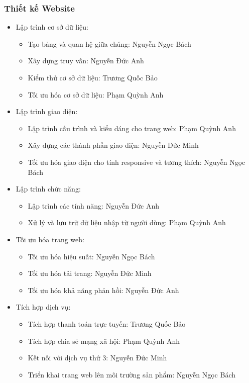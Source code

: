 \documentclass[12pt]{article}
\begin{document}
\subsubsection{Thiết kế Website}
\begin{itemize}[label=-, leftmargin=1cm]
    \item Lập trình cơ sở dữ liệu:
    \begin{itemize}[label=+, leftmargin=1cm]
        \item Tạo bảng và quan hệ giữa chúng: Nguyễn Ngọc Bách
        \item Xây dựng truy vấn: Nguyễn Đức Anh
        \item Kiểm thử cơ sở dữ liệu: Trương Quốc Bảo
        \item Tối ưu hóa cơ sở dữ liệu: Phạm Quỳnh Anh
    \end{itemize}
    \item Lập trình giao diện:
    \begin{itemize}[label=+, leftmargin=1cm]
        \item Lập trình cấu trình và kiểu dáng cho trang web: Phạm Quỳnh Anh
        \item Xây dựng các thành phần giao diện: Nguyễn Đức Minh
        \item Tối ưu hóa giao diện cho tính responsive và tương thích: Nguyễn Ngọc Bách
    \end{itemize}
    \item Lập trình chức năng: 
    \begin{itemize}[label=+, leftmargin=1cm]
        \item Lập trình các tính năng: Nguyễn Đức Anh
        \item Xử lý và lưu trữ dữ liệu nhập từ người dùng: Phạm Quỳnh Anh
    \end{itemize}
    \item Tối ưu hóa trang web:
    \begin{itemize}[label=+, leftmargin=1cm]
        \item Tối ưu hóa hiệu suất: Nguyễn Ngọc Bách
        \item Tối ưu hóa tải trang: Nguyễn Đức Minh
        \item Tối ưu hóa khả năng phản hồi: Nguyễn Đức Anh
    \end{itemize}
    \item Tích hợp dịch vụ:
    \begin{itemize}[label=+, leftmargin=1cm]
        \item Tích hợp thanh toán trực tuyến: Trương Quốc Bảo
        \item Tích hợp chia sẻ mạng xã hội: Phạm Quỳnh Anh
        \item Kết nối với dịch vụ thứ 3: Nguyễn Đức Minh
        \item Triển khai trang web lên môi trường sản phẩm: Nguyễn Ngọc Bách
    \end{itemize}
\end{itemize}
\end{document}
